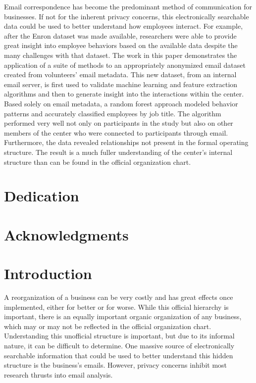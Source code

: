 \documentclass[12pt]{report}
\begin{document}
Email correspondence has become the predominant method of communication for businesses.
If not for the inherent privacy concerns, this electronically searchable data could be used to better understand how employees interact. 
For example, after the Enron dataset was made available, researchers were able to provide great insight into employee behaviors based on the available data despite the many challenges with that dataset.  
The work in this paper demonstrates the application of a suite of methods to an appropriately anonymized email dataset created from volunteers' email metadata.  
This new dataset, from an internal email server, is first used to validate machine learning and feature extraction algorithms and then to generate insight into the interactions within the center.  
Based solely on email metadata, a random forest approach modeled behavior patterns and accurately classified employees by job title.  
The algorithm performed very well not only on participants in the study but also on other members of the center who were connected to participants through email. 
Furthermore, the data revealed relationships not present in the formal operating structure. 
The result is a much fuller understanding of the center's internal structure than can be found in the official organization chart.


\vfill



\pagebreak

\chapter*{Dedication}
\chapter*{Acknowledgments}

\tableofcontents
\pagebreak

\listoffigures
\pagebreak

\listoftables
\pagebreak

\pagestyle{myheadings}

\chapter{Introduction} \label{Introduction}
A reorganization of a business can be very costly and has great effects once implemented, either for better or for worse.
While this official hierarchy is important, there is an equally important organic organization of any business, which may or may not be reflected in the official organization chart.
Understanding this unofficial structure is important, but due to its informal nature, it can be difficult to determine.
One massive source of electronically searchable information that could be used to better understand this hidden structure is the business's emails.
However, privacy concerns inhibit most research thrusts into email analysis.  
\end{document}
